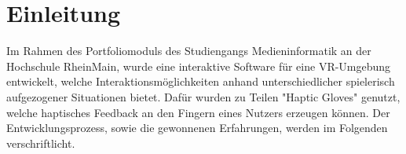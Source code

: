 \chapter{Einleitung}
Im Rahmen des Portfoliomoduls des Studiengangs Medieninformatik an der Hochschule RheinMain, wurde eine interaktive Software für eine VR-Umgebung entwickelt, welche Interaktionsmöglichkeiten anhand unterschiedlicher spielerisch aufgezogener Situationen bietet. Dafür wurden zu Teilen "Haptic Gloves" genutzt, welche haptisches Feedback an den Fingern eines Nutzers erzeugen können. Der Entwicklungsprozess, sowie die gewonnenen Erfahrungen, werden im Folgenden verschriftlicht.